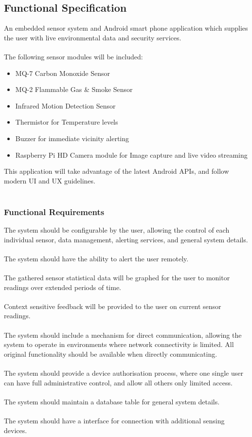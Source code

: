 \documentclass{article}
\begin{document}
\newpage
\subsection{Functional Specification}
An embedded sensor system and Android smart phone application which supplies the user with live environmental data and security services. \\\\
The following sensor modules will be included:

\begin{itemize}
  \item MQ-7 Carbon Monoxide Sensor
  \item MQ-2 Flammable Gas \& Smoke Sensor
  \item Infrared Motion Detection Sensor	
  \item Thermistor for Temperature levels
  \item Buzzer for immediate vicinity alerting
  \item Raspberry Pi HD Camera module for Image capture and live video streaming 
\end{itemize}

\noindent
This application will take advantage of the latest Android APIs, and follow modern UI and UX guidelines. \\\

\subsubsection{Functional Requirements}
The system should be configurable by the user, allowing the control of each individual sensor, data management, alerting services, and general system details. \\\\ The system should have the ability to alert the user remotely.  \\\\ The gathered sensor statistical data will be graphed for the user to monitor readings over extended periods of time. \\\\ Context sensitive feedback will be provided to the user on current sensor readings. \\\\ The system should include a mechanism for direct communication, allowing the system to operate in environments where network connectivity is limited. All original functionality should be available when directly communicating. \\\\ The system should provide a device authorisation process, where one single user can have full administrative control, and allow all others only limited access.  \\\\ The system should maintain a database table for general system details.\\\\
The system should have a interface for connection with additional sensing devices. 
\end{document}
